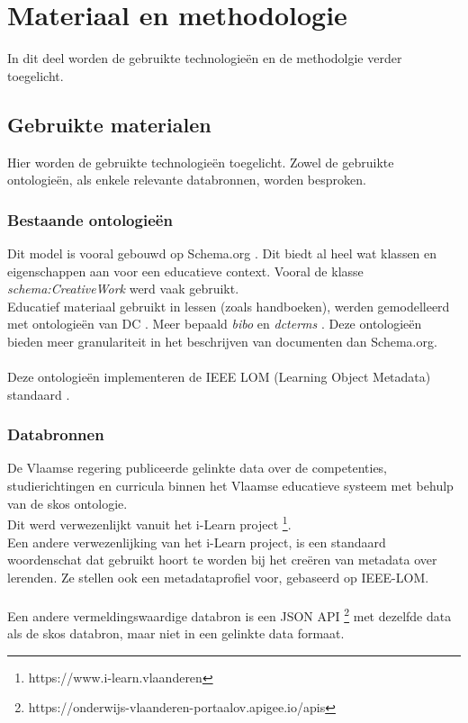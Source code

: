\documentclass[12pt,journal]{IEEEtran}
\begin{document}
\section{Materiaal en methodologie}
\noindent In dit deel worden de gebruikte technologieën en de methodolgie verder toegelicht.
	\subsection{Gebruikte materialen}
	\noindent Hier worden de gebruikte technologieën toegelicht. Zowel de gebruikte ontologieën, als enkele relevante databronnen, worden besproken.
		\subsubsection{Bestaande ontologieën}
		Dit model is vooral gebouwd op Schema.org \cite{schema}. Dit biedt al heel wat klassen en eigenschappen aan voor een educatieve context.
		Vooral de klasse \textit{schema:CreativeWork} werd vaak gebruikt.\\
		Educatief materiaal gebruikt in lessen (zoals handboeken), werden gemodelleerd met ontologieën van DC \cite{dc}.
		Meer bepaald \textit{bibo} \cite{bibo} en \textit{dcterms} \cite{dcterms}.
		Deze ontologieën bieden meer granulariteit in het beschrijven van documenten dan Schema.org.\\ \\
		Deze ontologieën implementeren de IEEE LOM (Learning Object Metadata) standaard \cite{ieeelom}.
		
		\subsubsection{Databronnen}
		De Vlaamse regering publiceerde gelinkte data \cite{ilearnskosmos} over de competenties, studierichtingen en curricula binnen het Vlaamse educatieve systeem met behulp van de skos ontologie.\\
		Dit werd verwezenlijkt vanuit het i-Learn project \footnote{https://www.i-learn.vlaanderen}. \\
		Een andere verwezenlijking van het i-Learn project, is een standaard woordenschat \cite{pubelovoc} dat gebruikt hoort te worden bij het creëren van metadata over lerenden.
		Ze stellen ook een metadataprofiel \cite{pubelo} voor, gebaseerd op IEEE-LOM.\\ \\
		Een andere vermeldingswaardige databron is een JSON API \footnote{https://onderwijs-vlaanderen-portaalov.apigee.io/apis} met dezelfde data als de skos databron, maar niet in een gelinkte data formaat.
\end{document}
